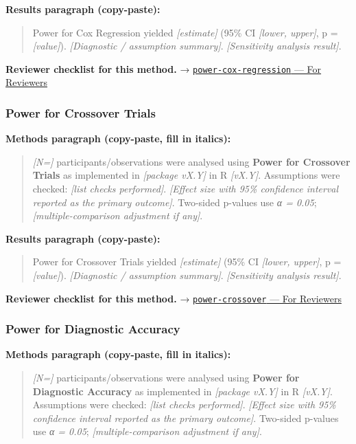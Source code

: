 \documentclass[
]{article}
\begin{document}
\textbf{Results paragraph (copy-paste):}

\begin{quote}
Power for Cox Regression yielded \emph{{[}estimate{]}} (95\% CI
\emph{{[}lower, upper{]}}, p = \emph{{[}value{]}}). \emph{{[}Diagnostic
/ assumption summary{]}}. \emph{{[}Sensitivity analysis result{]}}.
\end{quote}

\textbf{Reviewer checklist for this method.} →
\href{../chapters/05-power/power-cox-regression.Rmd\#for-reviewers}{\texttt{power-cox-regression}
--- For Reviewers}

\subsubsection{Power for Crossover
Trials}\label{power-for-crossover-trials}

\textbf{Methods paragraph (copy-paste, fill in italics):}

\begin{quote}
\emph{{[}N={]}} participants/observations were analysed using
\textbf{Power for Crossover Trials} as implemented in \emph{{[}package
vX.Y{]}} in R \emph{{[}vX.Y{]}}. Assumptions were checked: \emph{{[}list
checks performed{]}}. \emph{{[}Effect size with 95\% confidence interval
reported as the primary outcome{]}}. Two-sided p-values use \emph{α =
0.05}; \emph{{[}multiple-comparison adjustment if any{]}}.
\end{quote}

\textbf{Results paragraph (copy-paste):}

\begin{quote}
Power for Crossover Trials yielded \emph{{[}estimate{]}} (95\% CI
\emph{{[}lower, upper{]}}, p = \emph{{[}value{]}}). \emph{{[}Diagnostic
/ assumption summary{]}}. \emph{{[}Sensitivity analysis result{]}}.
\end{quote}

\textbf{Reviewer checklist for this method.} →
\href{../chapters/05-power/power-crossover.Rmd\#for-reviewers}{\texttt{power-crossover}
--- For Reviewers}

\subsubsection{Power for Diagnostic
Accuracy}\label{power-for-diagnostic-accuracy}

\textbf{Methods paragraph (copy-paste, fill in italics):}

\begin{quote}
\emph{{[}N={]}} participants/observations were analysed using
\textbf{Power for Diagnostic Accuracy} as implemented in
\emph{{[}package vX.Y{]}} in R \emph{{[}vX.Y{]}}. Assumptions were
checked: \emph{{[}list checks performed{]}}. \emph{{[}Effect size with
95\% confidence interval reported as the primary outcome{]}}. Two-sided
p-values use \emph{α = 0.05}; \emph{{[}multiple-comparison adjustment if
any{]}}.
\end{quote}
\end{document}
